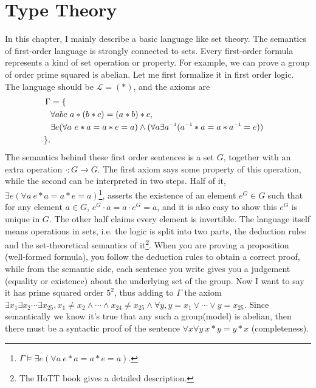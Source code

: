 \chapter{Type Theory}
\label{type-theory}

In this chapter, I mainly describe a basic language like set theory.
The semantics of first-order language is strongly connected to sets.
Every first-order formula represents a kind of set operation or property.
For example, we can prove a group of order prime squared is abelian.
Let me first formalize it in first order logic. The language should
be $\mathscr{L}=(\ast)$, and the axioms are
\begin{align*}
    \Gamma & = \{ & \\
        & \forall a b c\ a\ast(b\ast c)=(a\ast b)\ast c,\\
        & \exists e(\forall a\ e\ast a=a\ast e = a)
            \wedge (\forall a\exists a\inv(a\inv
                \ast a = a\ast a\inv=e))\\ 
    \}.
\end{align*}
The semantics behind these first order sentences is a set $G$,
together with an extra operation $\cdot: G\to G$. The first 
axiom says some property of this operation, while the second
can be interpreted in two steps. Half of it, $\exists e
(\forall a\ e\ast a=a\ast e = a)$\footnote{$\Gamma\models
\exists e(\forall a\ e\ast a=a\ast e = a)$.}, asserts the
existence of an element $e^G\in G$ such that for any element
$a\in G$, $e^G\cdot a= a\cdot e^G=a$, and it is also easy to
show this $e^G$ is unique in $G$. The other half claims every
element is invertible. The language itself means operations in
sets, i.e. the logic is split into two parts, the deduction rules and
the set-theoretical semantics of it\footnote{The HoTT book
\cite{homotopy-type-theory} gives a detailed description.}. When
you are proving a proposition (well-formed formula), you follow the
deduction rules to obtain a correct proof, while from the semantic
side, each sentence you write gives you a judgement (equality or 
existence) about the underlying set of the group. Now I want to say
it has prime squared order $5^2$, thus adding to $\Gamma$ the axiom
$\exists x_1\exists x_2\cdots\exists x_{25}, x_1\neq x_2\wedge\cdots
\wedge x_{24}\neq x_{25}\wedge\forall y, y=x_1\vee\cdots\vee y=x_{25}$. 
Since semantically we know it's true that any such a group(model) is 
abelian, then there must be a syntactic proof of the sentence 
$\forall x\forall y\ x\ast y=y\ast x$ (completeness).

